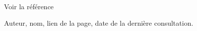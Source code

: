 \documentclass{article}
\begin{document}
Voir la référence \cite{maReference1}
    \begin{thebibliography}{10}
        Auteur, nom, lien de la page, date de la dernière consultation.
    
    \end{thebibliography}
\end{document}
